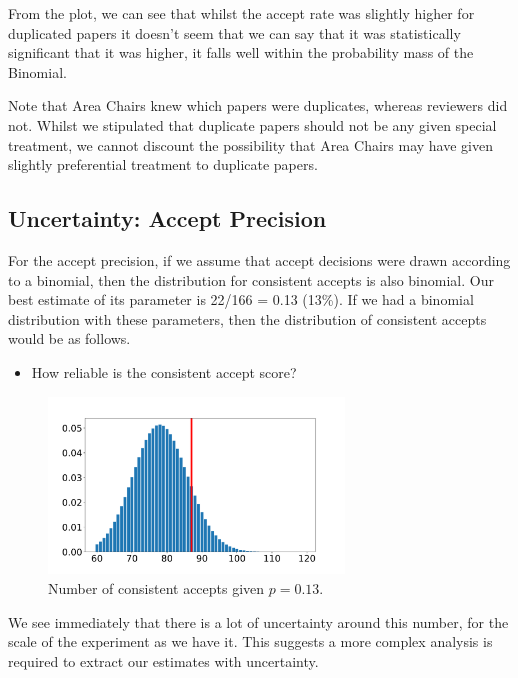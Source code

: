From the plot, we can see that whilst the accept rate was slightly
higher for duplicated papers it doesn't seem that we can say that it was
statistically significant that it was higher, it falls well within the
probability mass of the Binomial.

Note that Area Chairs knew which papers were duplicates, whereas
reviewers did not. Whilst we stipulated that duplicate papers should not
be any given special treatment, we cannot discount the possibility that
Area Chairs may have given slightly preferential treatment to duplicate
papers.

\hypertarget{uncertainty-accept-precision}{%
\subsection{Uncertainty: Accept
Precision}\label{uncertainty-accept-precision}}

For the accept precision, if we assume that accept decisions were drawn
according to a binomial, then the distribution for consistent accepts is
also binomial. Our best estimate of its parameter is 22/166 = 0.13
(13\%). If we had a binomial distribution with these parameters, then
the distribution of consistent accepts would be as follows.

\begin{itemize}
\tightlist
\item
  How reliable is the consistent accept score?
\end{itemize}

\begin{figure}[htb]
\includegraphics[width=0.70\textwidth]{diagrams/neurips/uncertainty-accept-rate.pdf}


\caption{Number of consistent accepts given $p=0.13$.}
\label{uncertainty-accept-precision}
\end{figure}

We see immediately that there is a lot of uncertainty around this
number, for the scale of the experiment as we have it. This suggests a
more complex analysis is required to extract our estimates with
uncertainty.

